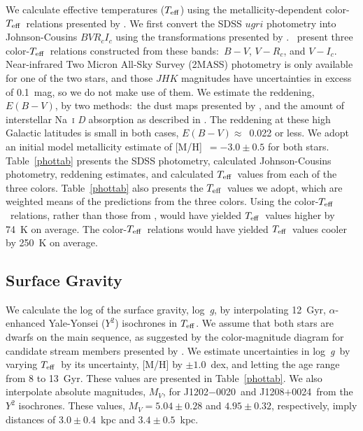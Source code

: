 \documentclass[twocolumn,tighten]{aastex62}
\newcommand{\jtwo}{J1202$-$0020}
\newcommand{\jeight}{J1208$+$0024}
\newcommand{\logg}{\mbox{log~{\it g}}}
\newcommand{\teff}{\mbox{$T_{\rm eff}$}}
\begin{document}
We calculate effective temperatures (\teff) using the 
metallicity-dependent color-\teff\ relations presented by
\citet{casagrande10}.
We first convert the SDSS $ugri$ photometry into Johnson-Cousins
$BVR_{c}I_{c}$ using the transformations presented by
\citet{jordi06}.
\citeauthor{casagrande10}\ present 
three color-\teff\ relations constructed from these bands:\
$B-V$, $V-R_{c}$, and $V-I_{c}$.
Near-infrared Two Micron All-Sky Survey (2MASS) photometry
is only available for one of the two stars,
and those $JHK$ magnitudes have uncertainties in excess
of 0.1~mag, so we do not make use of them.
We estimate the reddening, $E(B-V)$, by two methods:\ 
the dust maps presented by \citet{schlafly11}, 
and the amount of interstellar Na~\textsc{i} \textit{D} absorption 
\citep{bohlin78,spitzer78,ferlet85} as described in \citet{roederer18b}.
The reddening at these high Galactic latitudes is small in 
both cases, 
$E(B-V) \approx$~0.022 or less.
We adopt an initial model metallicity estimate of [M/H]~$= -3.0 \pm 0.5$
for both stars.
Table~\ref{phottab} presents the SDSS photometry,
calculated Johnson-Cousins photometry,
reddening estimates, 
and calculated \teff\ values from each of 
the three colors.
Table~\ref{phottab} also presents the \teff\ values we adopt,
which are weighted means of the predictions from
the three colors.
Using the \citet{ramirez05b} color-\teff\ relations,
rather than those from \citet{casagrande10},
would have yielded \teff\ values higher by 74~K on average.
The \citet{alonso99b} color-\teff\ relations
would have yielded \teff\ values cooler by 
250~K on average.




\subsection{Surface Gravity}
\label{gravity}


We calculate the log of the surface gravity,
\logg, by interpolating 12~Gyr,
$\alpha$-enhanced
Yale-Yonsei ($Y^{2}$) isochrones \citep{demarque04} 
in \teff.
We assume that both stars are dwarfs on the main sequence,
as suggested by the color-magnitude diagram for 
candidate stream members presented by \citetalias{ibata19a}.
We estimate uncertainties in \logg\ by varying \teff\ by its uncertainty,
[M/H] by $\pm 1.0$~dex,
and letting the age range from 8 to 13~Gyr.
These values are presented in Table~\ref{phottab}.
We also interpolate absolute magnitudes, $M_{V}$,
for \jtwo\ and \jeight\ from the $Y^{2}$ isochrones.
These values, 
$M_{V} = 5.04 \pm 0.28$ and $4.95 \pm 0.32$, respectively,
imply distances of 
$3.0 \pm 0.4$~kpc and $3.4 \pm 0.5$~kpc.
\end{document}
